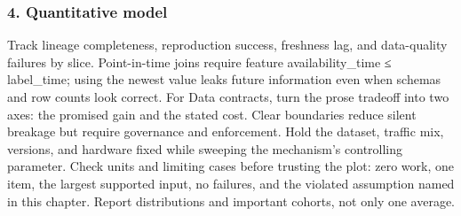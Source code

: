 \subsubsection*{4. Quantitative model}
Track lineage completeness, reproduction success, freshness lag, and data-quality failures by slice. Point-in-time joins require feature availability\_time ≤ label\_time; using the newest value leaks future information even when schemas and row counts look correct.
For Data contracts, turn the prose tradeoff into two axes: the promised gain and the stated cost. Clear boundaries reduce silent breakage but require governance and enforcement. Hold the dataset, traffic mix, versions, and hardware fixed while sweeping the mechanism's controlling parameter.
Check units and limiting cases before trusting the plot: zero work, one item, the largest supported input, no failures, and the violated assumption named in this chapter. Report distributions and important cohorts, not only one average.

